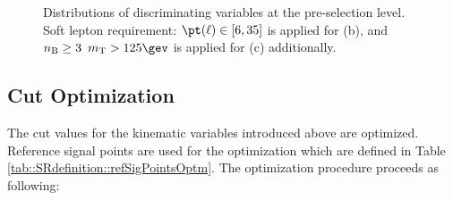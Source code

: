 \begin{figure}[h]
  \centering
    \caption{ 
    Distributions of discriminating variables at the pre-selection level.
    Soft lepton requirement: $\pt(\ell)\in[6,35]$ is applied for (b),
    and $\nBJetNoGev \geq3 \,\,\, \mt>125\gev$ is applied for (c) additionally. 
    \label{fig::SRdefinition::distVar2}
    }
\end{figure}



\clearpage		
\subsection{Cut Optimization}
The cut values for the kinematic variables introduced above are optimized.
Reference signal points are used for the optimization which are defined in Table \ref{tab::SRdefinition::refSigPointsOptm}. 
The optimization procedure proceeds as following:

